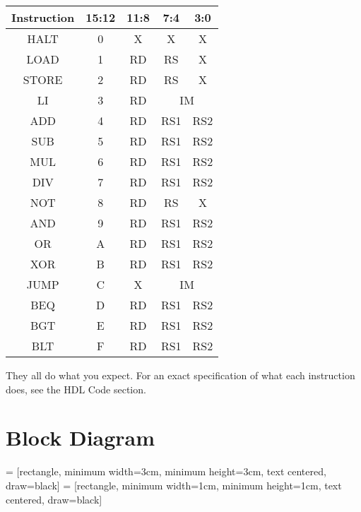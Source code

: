 \documentclass{article}
\begin{document}
\vspace{1em}
\begin{tabular}{|c|c|c|c|c|}
    \hline
    Instruction & 15:12 & 11:8 & 7:4 & 3:0 \\
    \hline
    HALT & 0 & X & X & X \\
    LOAD & 1 & RD & RS & X \\
    STORE & 2 & RD & RS & X \\
    LI & 3 & RD & \multicolumn{2}{c|}{IM} \\
    ADD & 4 & RD & RS1 & RS2 \\
    SUB & 5 & RD & RS1 & RS2 \\
    MUL & 6 & RD & RS1 & RS2 \\
    DIV & 7 & RD & RS1 & RS2 \\
    NOT & 8 & RD & RS & X \\
    AND & 9 & RD & RS1 & RS2 \\
    OR & A & RD & RS1 & RS2 \\
    XOR & B & RD & RS1 & RS2 \\
    JUMP & C & X & \multicolumn{2}{c|}{IM} \\
    BEQ & D & RD & RS1 & RS2 \\
    BGT & E & RD & RS1 & RS2 \\
    BLT & F & RD & RS1 & RS2 \\
    \hline
\end{tabular}
\vspace{1em}

\raggedright

They all do what you expect. For an exact specification of what each instruction does, see the HDL Code section.

\section{Block Diagram}

\centering

 = [rectangle, minimum width=3cm, minimum height=3cm, text centered, draw=black]
 = [rectangle, minimum width=1cm, minimum height=1cm, text centered, draw=black]

\end{document}

